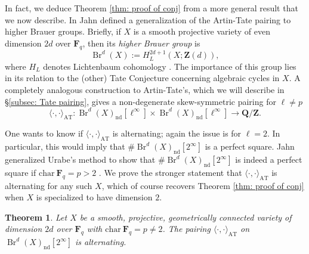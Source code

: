 \documentclass[10pt, reqno]{amsart}
\numberwithin{equation}{subsection}
\newcommand{\F}{\mathbf{F}}
\newcommand{\Q}{\mathbf{Q}}
\newcommand{\Z}{\mathbf{Z}}
\newcommand{\mrm}[1]{\mathrm{#1}}
\newcommand{\co}{\colon}
\DeclareMathOperator{\Br}{Br}
\DeclareMathOperator{\nd}{nd}
\newtheorem{thm}{Theorem}[section]
\theoremstyle{remark}
\newtheorem{remark}[thm]{Remark}
\begin{document}
 
 
 

 
In fact, we deduce Theorem \ref{thm: proof of conj} from a more general result that we now describe. In \cite{Jahn15} Jahn defined a generalization of the Artin-Tate pairing to higher Brauer groups. Briefly, if $X$ is a smooth projective variety of even dimension $2d$ over $\F_q$, then its \emph{higher Brauer group} is 
\[
\Br^d(X):= H_L^{2d+1}(X; \Z(d)),
\]
where $H_L$ denotes Lichtenbaum cohomology \cite[\S 2]{Jahn15}. The importance of this group lies in its relation to the (other) Tate Conjecture concerning algebraic cycles in $X$. A completely analogous construction to Artin-Tate's, which we will describe in \S \ref{subsec: Tate pairing}, gives a non-degenerate skew-symmetric pairing for $\ell \neq p$ 
\[
\langle \cdot, \cdot  \rangle_{\mrm{AT}} \co \Br^d(X)_{\nd}[\ell^{\infty}] \times \Br^d(X)_{\nd} [\ell^{\infty}] \rightarrow \Q/\Z.
\]

One wants to know if $\langle \cdot, \cdot  \rangle_{\mrm{AT}}$ is alternating; again the issue is for $\ell=2$. In particular, this would imply that $\# \Br^d(X)_{\nd}[2^{\infty}]$ is a perfect square. Jahn generalized Urabe's method to show that $\# \Br^d(X)_{\nd}[2^{\infty}]$ is indeed a perfect square if $\mrm{char} \ \F_q = p >2$ \cite[Theorem 1]{Jahn15}. We prove the stronger statement that $\langle \cdot, \cdot  \rangle_{\mrm{AT}}$ is alternating for any such $X$, which of course recovers Theorem \ref{thm: proof of conj} when $X$ is specialized to have dimension $2$. 
 
 

\begin{thm}\label{thm: main}
Let $X$ be a smooth, projective, geometrically connected variety of dimension $2d$ over $\F_q$ with $\mrm{char} \ \F_q = p \neq 2$. The pairing $\langle  \cdot, \cdot \rangle_{\mrm{AT}} $ on $\Br^d(X)_{\nd}[2^{\infty}]$ is alternating. 
\end{thm}
\end{document}

